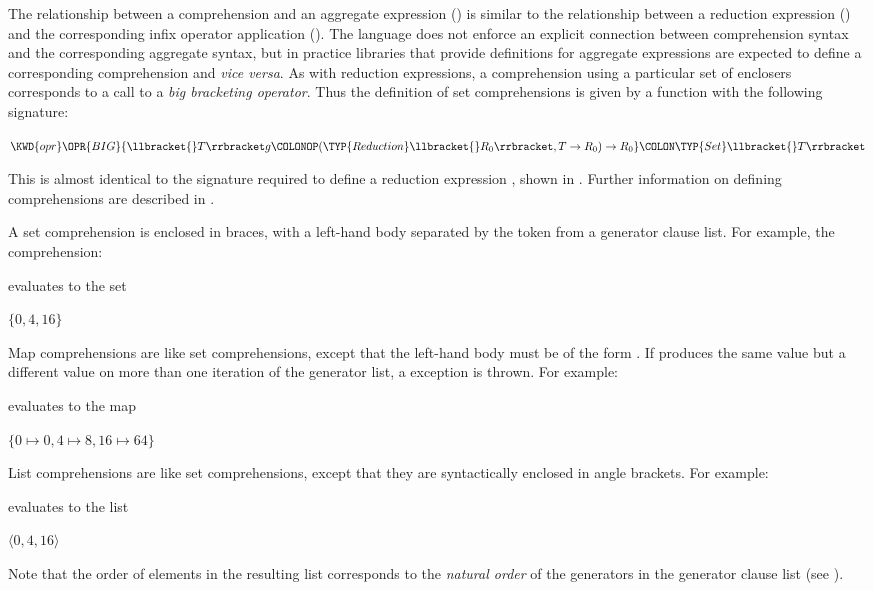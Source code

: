 The relationship between a comprehension and an aggregate expression () is similar to the relationship between a reduction expression () and the corresponding infix operator application ().  The language does not enforce an explicit connection between comprehension syntax and the corresponding aggregate syntax, but in practice libraries that provide definitions for aggregate expressions are expected to define a corresponding comprehension and \emph{vice versa}.  As with reduction expressions, a comprehension using a particular set of enclosers corresponds to a call to a \emph{big bracketing operator}.  Thus the definition of set comprehensions is given by a function with the following signature:
\begin{Fortress}
\(\KWD{opr} \mathord{\OPR{BIG}} \{\llbracket{}T\rrbracket g\COLONOP(\TYP{Reduction}\llbracket{}R_{0}\rrbracket,T\rightarrow{}R_{0})\rightarrow{}R_{0}\}\COLON \TYP{Set}\llbracket{}T\rrbracket\)
\end{Fortress}
This is almost identical to the signature required to define a reduction
expression , shown in .
Further information on defining comprehensions are described
in .

A set comprehension is enclosed in braces, with a left-hand body
separated by the token \EXP{|} from a generator clause list.
For example, the comprehension:

evaluates to the set
\begin{Fortress}
\(\{0, 4, 16\}\)
\end{Fortress}

Map comprehensions are like set comprehensions,
except that the left-hand body must be of the form
.
If  produces the same value but  a different value on more
than one iteration of the generator list,
a  exception is thrown.
For example:

evaluates to the map
\begin{Fortress}
\(\{0 \mapsto 0, 4 \mapsto 8, 16 \mapsto 64\}\)
\end{Fortress}


List comprehensions are like set comprehensions,
except that they are syntactically enclosed in angle brackets.
For example:

evaluates to the list
\begin{Fortress}
\(\langle 0, 4, 16 \rangle\)
\end{Fortress}
Note that the order of elements in the resulting list corresponds to
the \emph{natural order} of the generators in the generator clause
list (see ).

